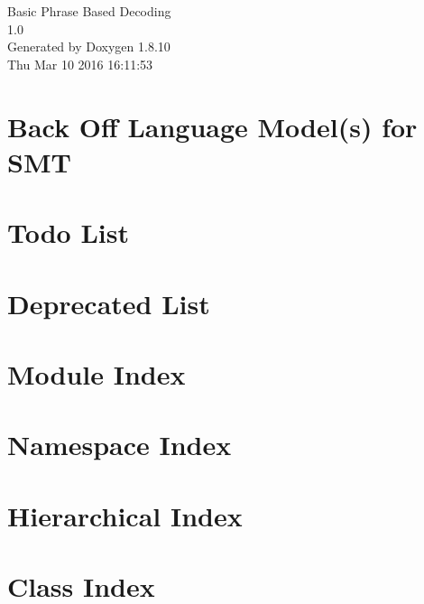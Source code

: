 \documentclass[twoside]{book}
\newcommand{\+}{\discretionary{\mbox{\scriptsize$\hookleftarrow$}}{}{}}
\newcommand{\clearemptydoublepage}{%
  \newpage{\pagestyle{empty}\cleardoublepage}%
}
\begin{document}
\hypersetup{pageanchor=false,
             bookmarks=true,
             bookmarksnumbered=true,
             pdfencoding=unicode
            }
\begin{titlepage}
\vspace*{7cm}
\begin{center}%
{\Large Basic Phrase Based Decoding \\[1ex]\large 1.\+0 }\\
\vspace*{1cm}
{\large Generated by Doxygen 1.8.10}\\
\vspace*{0.5cm}
{\small Thu Mar 10 2016 16:11:53}\\
\end{center}
\end{titlepage}
\clearemptydoublepage
\tableofcontents
\clearemptydoublepage
{}
\hypersetup{pageanchor=true}

\chapter{Back Off Language Model(s) for S\+M\+T}
\label{md__r_e_a_d_m_e}
\hypertarget{md__r_e_a_d_m_e}{}

\chapter{Todo List}
\label{todo}
\hypertarget{todo}{}

\chapter{Deprecated List}
\label{deprecated}
\hypertarget{deprecated}{}

\chapter{Module Index}

\chapter{Namespace Index}

\chapter{Hierarchical Index}

\chapter{Class Index}

\end{document}

